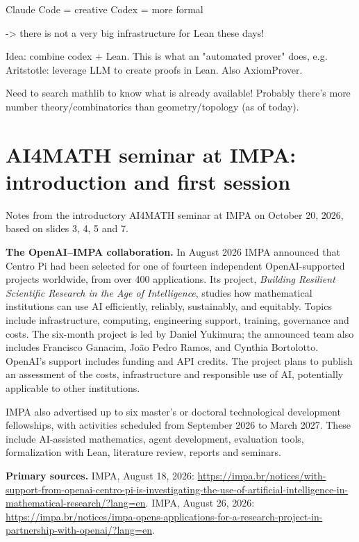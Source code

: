 Claude Code = creative
Codex = more formal

-> there is not a very big infrastructure
for Lean these days!

Idea: combine codex + Lean.
This is what an "automated prover" does,
e.g. Aritstotle: leverage LLM
to create proofs in Lean.
Also AxiomProver.


Need to search mathlib to know what is already
available! Probably there's more
number theory/combinatorics than
geometry/topology (as of today).

\section{AI4MATH seminar at IMPA:
introduction and first session}
\label{section-ai4math-seminar}

Notes from the introductory AI4MATH
seminar at IMPA on October 20, 2026,
based on slides 3, 4, 5 and 7.

\medskip\noindent
\textbf{The OpenAI--IMPA collaboration.}
In August 2026 IMPA announced that Centro Pi
had been selected for one of fourteen
independent OpenAI-supported projects
worldwide, from over 400 applications. Its
project, \emph{Building Resilient Scientific
Research in the Age of Intelligence}, studies
how mathematical institutions can use AI
efficiently, reliably, sustainably, and
equitably. Topics include infrastructure,
computing, engineering support, training,
governance and costs. The six-month project
is led by Daniel Yukimura; the announced team
also includes Francisco Ganacim,
Jo\~ao Pedro Ramos, and Cynthia Bortolotto.
OpenAI's support includes funding and API
credits. The project plans to publish an
assessment of the costs, infrastructure and
responsible use of AI, potentially applicable
to other institutions.

IMPA also advertised up to six master's or
doctoral technological development
fellowships, with activities scheduled from
September 2026 to March 2027. These include
AI-assisted mathematics, agent development,
evaluation tools, formalization with Lean,
literature review, reports and seminars.

\medskip\noindent
\textbf{Primary sources.}
IMPA, August 18, 2026:
\url{https://impa.br/notices/with-support-from-openai-centro-pi-is-investigating-the-use-of-artificial-intelligence-in-mathematical-research/?lang=en}.
IMPA, August 26, 2026:
\url{https://impa.br/notices/impa-opens-applications-for-a-research-project-in-partnership-with-openai/?lang=en}.

